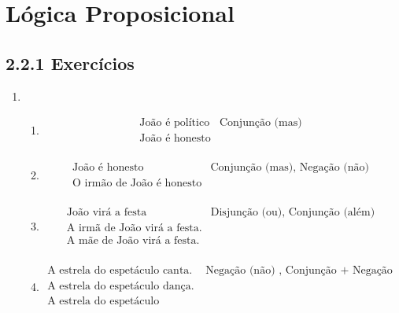 \section{L\'ogica Proposicional}

\subsection{2.2.1 Exerc\'icios}

	\begin{enumerate}
		\item 
			\begin{enumerate}
				\item
				 \[\begin{array}{ll}    
				 \text{Jo\~ao \'e pol\'itico} & \text{Conjun\c{c}\~ao (mas) }\\
				 \text{Jo\~ao \'e honesto} & \\
				 \end{array}
				 \]
				 
				 \item
				 \[\begin{array}{ll}    
 				 \text{Jo\~ao \'e honesto} & \text{Conjun\c{c}\~ao (mas), Nega\c{c}\~ao (n\~ao) }\\
 				 \text{O irm\~ao de Jo\~ao \'e honesto} & \\
 				 \end{array}
 				 \]
 				 
 				 \item
 				 \[\begin{array}{ll}    
  				 \text{Jo\~ao vir\'a a festa} & \text{Disjun\c{c}\~ao (ou), Conjun\c{c}\~ao (al\'em) }\\
  				 \text{A irm\~a de Jo\~ao vir\'a a festa.} & \\
  				 \text{A m\~ae de Jo\~ao vir\'a a festa.} & \\
  				 \end{array}
  				 \]
				 
				 \item
  				 \[\begin{array}{ll}    
   				 \text{A estrela do espet\'aculo canta.} & \text{Nega\c{c}\~ao (n\~ao) , Conjun\c{c}\~ao + Nega\c{c}\~ao (nem)} \\
   				 \text{A estrela do espet\'aculo dan\c{c}a.} & \\
   				 \text{A estrela do espet\'aculo representa.} & \\
   				 \end{array}
   				 \]
				 

\end{enumerate}
\end{enumerate}
